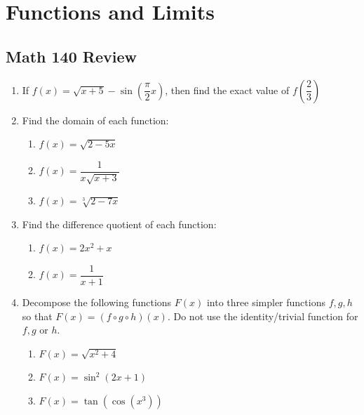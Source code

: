 \documentclass[letterpaper,11pt]{article}
\begin{document}
\tableofcontents

\newpage

\section{Functions and Limits}
\subsection{Math 140 Review}
\begin{enumerate}
  \item If $f(x) = \sqrt{x+5}-\sin\left( \dfrac{\pi}{2}x\right)$, then find the exact value of $f\left(\dfrac{2}{3}\right)$
  \item Find the domain of each function:
  \begin{enumerate}
    \item $f(x) = \sqrt{2-5x}$
    \item $f(x) = \dfrac{1}{x\sqrt{x+3}}$
    \item $f(x) = \sqrt[3]{2-7x}$
  \end{enumerate}
  \item Find the difference quotient of each function:
  \begin{enumerate}
    \item $f(x) = 2x^2+x$
    \item $f(x) = \dfrac{1}{x+1}$
  \end{enumerate}
  \item Decompose the following functions $F(x)$ into three simpler functions $f,g,h$ so that $F(x) = (f\circ g\circ h)(x)$. Do not use the identity/trivial function for $f,g$ or $h$.
  \begin{enumerate}
    \item $F(x) = \sqrt{x^2+4}$
    \item $F(x) = \sin^2(2x+1)$
    \item $F(x) = \tan(\cos(x^3))$
  \end{enumerate}
\end{enumerate}

\newpage
\end{document}
